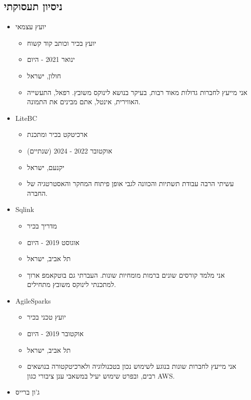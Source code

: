 \documentclass[
  hebrew,
]{article}
\providecommand{\tightlist}{%
  \setlength{\itemsep}{0pt}\setlength{\parskip}{0pt}}
\begin{document}
\subsection{ניסיון
תעסוקתי}\label{ux5e0ux5d9ux5e1ux5d9ux5d5ux5df-ux5eaux5e2ux5e1ux5d5ux5e7ux5eaux5d9}

\begin{itemize}
\tightlist
\item
  יועץ עצמאי

  \begin{itemize}
  \tightlist
  \item
    יועץ בכיר וכותב קוד קשוח
  \item
    ינואר 2021 - היום
  \item
    חולון, ישראל
  \item
    אני מייעץ לחברות גדולות מאוד רבות, בעיקר בנושא לינוקס משובץ. רפאל,
    התעשייה האווירית, אינטל, אתם מבינים את התמונה.
  \end{itemize}
\item
  LiteBC

  \begin{itemize}
  \tightlist
  \item
    ארכיטקט בכיר ומתכנת
  \item
    אוקטובר 2022 - 2024 (שנתיים)
  \item
    יקנעם, ישראל
  \item
    עשיתי הרבה עבודת תשתיות והכוונה לגבי אופן פיתוח המחקר והאסטרטגיה של
    החברה.
  \end{itemize}
\item
  Sqlink

  \begin{itemize}
  \tightlist
  \item
    מדריך בכיר
  \item
    אוגוסט 2019 - היום
  \item
    תל אביב, ישראל
  \item
    אני מלמד קורסים שונים ברמות מומחיות שונות. העברתי גם בוטקאמפ ארוך
    למתכנתי לינוקס משובץ מתחילים.
  \end{itemize}
\item
  AgileSparks

  \begin{itemize}
  \tightlist
  \item
    יועץ טכני בכיר
  \item
    אוקטובר 2019 - היום
  \item
    תל אביב, ישראל
  \item
    אני מייעץ לחברות שונות בנוגע לשימוש נכון בטכנולוגיה ולארכיטקטורה
    בנושאים רבים, ובפרט שימוש יעיל במשאבי ענן ציבורי כגון AWS.
  \end{itemize}
\item
  ג'ון ברייס


\end{itemize}
\end{document}
